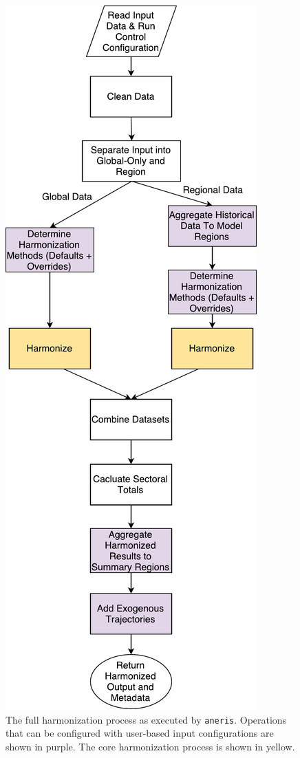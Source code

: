 \documentclass[review]{elsarticle}
\newcommand{\code}[1]{\lstinline[basicstyle=\ttfamily\color{black}]|#1|}
\begin{document}
\begin{figure}
  \begin{center}
    \includegraphics[height=0.9\textheight]{aneris-workflow.pdf}
    \caption[]{
      \label{fig:workflow}
      The full harmonization process as executed by \code{aneris}. Operations
      that can be configured with user-based input configurations are shown in
      purple. The core harmonization process is shown in yellow.  }
  \end{center}
\end{figure}
\end{document}
